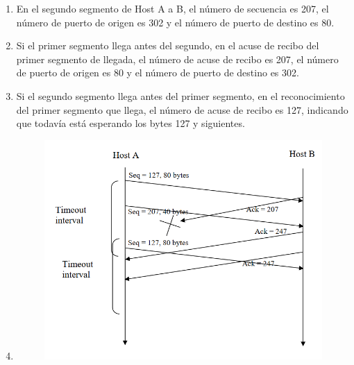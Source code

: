 \documentclass[a4paper, 11pt]{article}
\theoremstyle{definition} \theoremstyle{remark}
\begin{document}
    \begin{enumerate}
      \item En el segundo segmento de Host A a B, el n\'umero de secuencia es 207, el n\'umero de puerto de origen es 302 y el n\'umero de puerto de destino es 80.
      \item Si el primer segmento llega antes del segundo, en el acuse de recibo del primer segmento de llegada, el n\'umero de acuse de recibo es 207, el n\'umero de puerto de origen es 80 y el n\'umero de puerto de destino es 302.
      \item Si el segundo segmento llega antes del primer segmento, en el reconocimiento del primer segmento que llega, el n\'umero de acuse de recibo es 127, indicando que todav\'ia est\'a esperando los bytes 127 y siguientes.
      \item \begin{figure}
              \centering
              \includegraphics[width=0.8\linewidth]{1.png}
              \caption{}\label{A}
            \end{figure}
            \newpage
    \end{enumerate}
\end{document}
